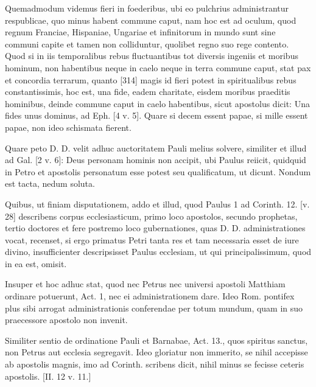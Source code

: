 Quemadmodum videmus fieri in foederibus, ubi eo pulchrius administrantur respublicae, quo minus habent commune caput, nam hoc est ad oculum, quod regnum Franciae, Hispaniae, Ungariae et infinitorum in mundo sunt sine communi capite et tamen non colliduntur, quolibet regno suo rege contento. Quod si in iis temporalibus rebus fluctuantibus tot diversis ingeniis et moribus hominum, non habentibus neque in caelo neque in terra commune caput, stat pax et concordia terrarum, quanto [314] magis id fieri potest in spiritualibus rebus constantissimis, hoc est, una fide, eadem charitate, eisdem moribus praeditis hominibus, deinde commune caput in caelo habentibus, sicut apostolus dicit: Una fides unus dominus, ad Eph. [4 v. 5]. Quare si decem essent papae, si mille essent papae, non ideo schismata fierent.

Quare peto D. D. velit adhuc auctoritatem Pauli melius solvere, similiter et illud ad Gal. [2 v. 6]: Deus personam hominis non accipit, ubi Paulus reiicit, quidquid in Petro et apostolis personatum esse potest seu qualificatum, ut dicunt. Nondum est tacta, nedum soluta.

Quibus, ut finiam disputationem, addo et illud, quod Paulus 1 ad Corinth. 12. [v. 28] describens corpus ecclesiasticum, primo loco apostolos, secundo prophetas, tertio doctores et fere postremo loco gubernationes, quas D. D. administrationes vocat, recenset, si ergo primatus Petri tanta res et tam necessaria esset de iure divino, insufficienter descripsisset Paulus ecclesiam, ut qui principalissimum, quod in ea est, omisit.

Insuper et hoc adhuc stat, quod nec Petrus nec universi apostoli Matthiam ordinare potuerunt, Act. 1, nec ei administrationem dare. Ideo Rom. pontifex plus sibi arrogat administrationis conferendae per totum mundum, quam in suo praecessore apostolo non invenit.

Similiter sentio de ordinatione Pauli et Barnabae, Act. 13., quos spiritus sanctus, non Petrus aut ecclesia segregavit. Ideo gloriatur non immerito, se nihil accepisse ab apostolis magnis, imo ad Corinth. scribens dicit, nihil minus se fecisse ceteris apostolis. [II. 12 v. 11.]

